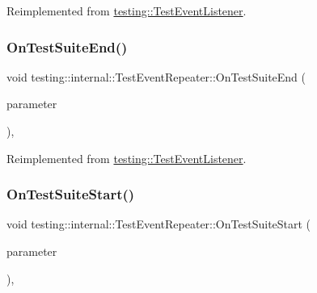 Reimplemented from \mbox{\hyperlink{classtesting_1_1_test_event_listener_a8962caad5d2522c9160c794074a662ee}{testing\+::\+Test\+Event\+Listener}}.

\mbox{\label{classtesting_1_1internal_1_1_test_event_repeater_a59e442d1f79ea186499ef99284a60d4c}} 
\subsubsection{\texorpdfstring{OnTestSuiteEnd()}{OnTestSuiteEnd()}\hspace{0.1cm}{\footnotesize\ttfamily [2/2]}}
{\footnotesize\ttfamily void testing\+::internal\+::\+Test\+Event\+Repeater\+::\+On\+Test\+Suite\+End (\begin{DoxyParamCaption}\item[{const \mbox{\hyperlink{classtesting_1_1_test_suite}{Test\+Suite}} \&}]{parameter }\end{DoxyParamCaption})\hspace{0.3cm}{\ttfamily [override]}, {\ttfamily [virtual]}}



Reimplemented from \mbox{\hyperlink{classtesting_1_1_test_event_listener_a8962caad5d2522c9160c794074a662ee}{testing\+::\+Test\+Event\+Listener}}.

\mbox{\label{classtesting_1_1internal_1_1_test_event_repeater_aa54fdafe6dfdd46dbac108c17016a5f9}} 
\subsubsection{\texorpdfstring{OnTestSuiteStart()}{OnTestSuiteStart()}\hspace{0.1cm}{\footnotesize\ttfamily [1/2]}}
{\footnotesize\ttfamily void testing\+::internal\+::\+Test\+Event\+Repeater\+::\+On\+Test\+Suite\+Start (\begin{DoxyParamCaption}\item[{const \mbox{\hyperlink{classtesting_1_1_test_suite}{Test\+Suite}} \&}]{parameter }\end{DoxyParamCaption})\hspace{0.3cm}{\ttfamily [override]}, {\ttfamily [virtual]}}



